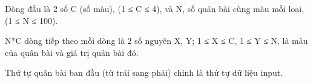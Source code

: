Dòng đầu là 2 số C (số màu), (1 ≤ C ≤ 4), và N, số quân bài cùng màu mỗi loại, (1 ≤ N ≤ 100).  

   N*C dòng tiếp theo mỗi dòng là 2 số nguyên X, Y; 1 ≤ X ≤ C, 1 ≤ Y ≤ N,  là màu của quân bài và giá trị quân bài đó.  

   Thứ tự quân bài ban đầu (từ trái sang phải) chính là thứ tự dữ liệu input.  



\